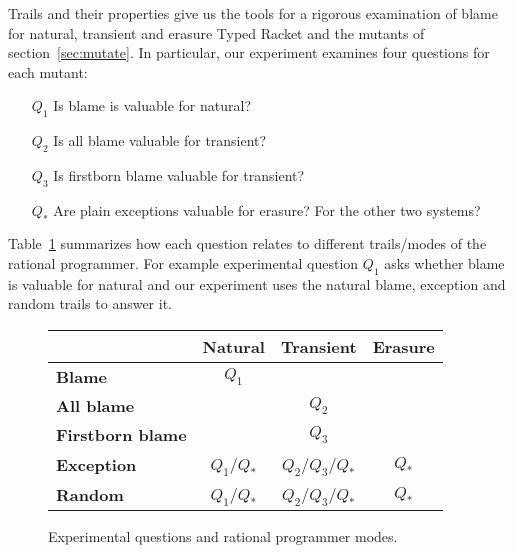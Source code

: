 Trails and their properties give us the tools for a rigorous examination
of blame for natural, transient and erasure Typed Racket and the 
mutants of section~\ref{sec:mutate}. In particular, our experiment examines 
four questions for each mutant:
\begin{itemize}
\item[$Q_1$] Is blame is valuable for natural?

\item[$Q_2$] Is all blame valuable for transient?

\item[$Q_3$] Is firstborn blame valuable for transient?

\item[$Q_*$] Are plain exceptions valuable for
  erasure? For the other two systems? 
\end{itemize}

Table~\ref{fig:experiment-outline} summarizes how each question relates to
different trails/modes of the rational programmer. For example experimental
question $Q_1$ asks whether blame is valuable for natural and our experiment
uses the natural blame, exception and random trails to answer it.

\begin{figure}
\center
{\begin{tabular}[ht]{l|c|c|c}
                        & {\bf Natural}        & {\bf Transient}          & {\bf Erasure} \\ \hline 
{\bf Blame}             &       $Q_1$          &                          &               \\
{\bf All blame}         &                      &     $Q_2$                &               \\
{\bf Firstborn blame}   &                      &     $Q_3$                &               \\
{\bf Exception}         &       $Q_1$/$Q_*$    &     $Q_2$/$Q_3$/$Q_*$    &      $Q_*$    \\
{\bf Random}            &       $Q_1$/$Q_*$    &     $Q_2$/$Q_3$/$Q_*$    &      $Q_*$    \\
\end{tabular}}
  \caption{ Experimental questions and rational programmer modes.}
  \label{fig:experiment-outline}
\end{figure}

